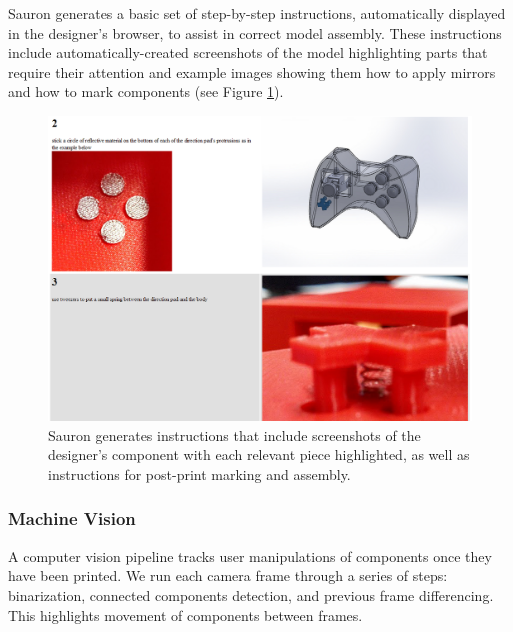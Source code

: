 Sauron generates a basic set of step-by-step instructions, automatically displayed in the designer's browser, to assist in correct model assembly. These instructions include automatically-created screenshots of the model highlighting parts that require their attention and example images showing them how to apply mirrors and how to mark components (see Figure \ref{fig:sauron-instructions}).%

\begin{figure}
\centering
\includegraphics[width=\textwidth]{figures/sauron/directions.PNG}
\caption{Sauron generates instructions that include screenshots of the designer's component with each relevant piece highlighted, as well as instructions for post-print marking and assembly.}
\label{fig:sauron-instructions}
\end{figure}

\subsubsection{Machine Vision}
A computer vision pipeline tracks user manipulations of components once they have been printed.
We run each camera frame through a series of steps: binarization, connected components detection, and previous frame differencing. This highlights movement of components between frames.

